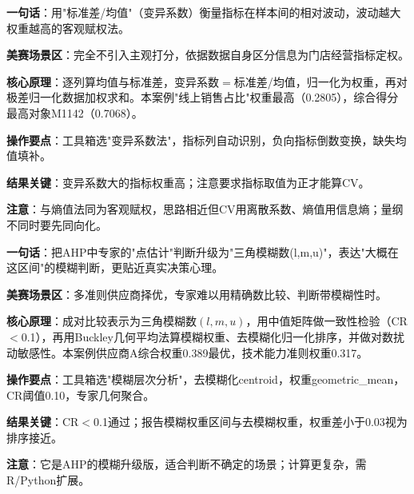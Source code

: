 
\begin{algobrief}
\textbf{一句话}：用"标准差/均值"（变异系数）衡量指标在样本间的相对波动，波动越大权重越高的客观赋权法。

\textbf{美赛场景区}：完全不引入主观打分，依据数据自身区分信息为门店经营指标定权。

\textbf{核心原理}：逐列算均值与标准差，变异系数$=$标准差/均值，归一化为权重，再对极差归一化数据加权求和。本案例"线上销售占比"权重最高（0.2805），综合得分最高对象M1142（0.7068）。

\textbf{操作要点}：工具箱选"变异系数法"，指标列自动识别，负向指标倒数变换，缺失均值填补。

\textbf{结果关键}：变异系数大的指标权重高；注意要求指标取值为正才能算CV。

\textbf{注意}：与熵值法同为客观赋权，思路相近但CV用离散系数、熵值用信息熵；量纲不同时要先同向化。
\end{algobrief}


\begin{algobrief}
\textbf{一句话}：把AHP中专家的"点估计"判断升级为"三角模糊数(l,m,u)"，表达"大概在这区间"的模糊判断，更贴近真实决策心理。

\textbf{美赛场景区}：多准则供应商择优，专家难以用精确数比较、判断带模糊性时。

\textbf{核心原理}：成对比较表示为三角模糊数$(l,m,u)$，用中值矩阵做一致性检验（CR$<$0.1），再用Buckley几何平均法算模糊权重、去模糊化归一化排序，并做对数扰动敏感性。本案例供应商A综合权重0.389最优，技术能力准则权重0.317。

\textbf{操作要点}：工具箱选"模糊层次分析"，去模糊化centroid，权重geometric\_mean，CR阈值0.10，专家几何聚合。

\textbf{结果关键}：CR$<$0.1通过；报告模糊权重区间与去模糊权重，权重差小于0.03视为排序接近。

\textbf{注意}：它是AHP的模糊升级版，适合判断不确定的场景；计算更复杂，需R/Python扩展。
\end{algobrief}


